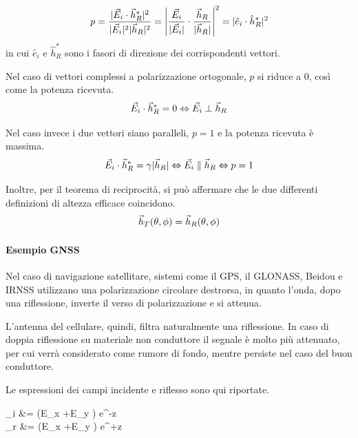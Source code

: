\begin{equation}
	p
	=\frac{|\vec{E}_i \cdot \vec{h}_R^*|^2}{|\vec{E}_i|^2 |\vec{h}_R|^2}
	= \left|
		\frac{\vec{E}_i}{|\vec{E}_i|}\cdot\frac{\vec{h}_R}{|\vec{h}_R|}
	\right|^2
	= |\hat{e}_i \cdot \hat{h}_R^*|^2
\end{equation}
in cui $\hat{e}_i$ e $\hat{h}_R^*$ sono i fasori di direzione dei corrispondenti vettori.

Nel caso di vettori complessi a polarizzazione ortogonale, $p$ si riduce a 0, così come la potenza ricevuta.
\begin{equation}
	\vec{E}_i \cdot \vec{h}_R^* =0 \Leftrightarrow \vec{E}_i \perp \vec{h}_R
\end{equation}

Nel caso invece i due vettori siano paralleli, $p = 1$ e la potenza ricevuta è massima.
\begin{equation}
	\vec{E}_i \cdot \vec{h}_R^* = \gamma |\vec{h}_R|
	\Leftrightarrow \vec{E}_i \parallel \vec{h}_R
	\Leftrightarrow p=1
\end{equation}

\bigbreak
Inoltre, per il teorema di reciprocità, si può affermare che le due differenti definizioni di altezza efficace coincidono.
\begin{equation}
	\vec{h}_T(\theta,\phi) = \vec{h}_R(\theta,\phi)
\end{equation}

\paragraph{Esempio GNSS}
Nel caso di navigazione satellitare, sistemi come il GPS, il \textsc{GLONASS}, Beidou e \textsc{IRNSS} utilizzano una polarizzazione circolare destrorsa, in quanto l'onda, dopo una riflessione, inverte il verso di polarizzazione e si attenua.

L'antenna del cellulare, quindi, filtra naturalmente una riflessione. In caso di doppia riflessione su materiale non conduttore il segnale è molto più attenuato, per cui verrà considerato come rumore di fondo, mentre persiste nel caso del buon conduttore.

Le espressioni dei campi incidente e riflesso sono qui riportate.
\begin{esp*}
	\E_i &= (E_x \cdot {}+E_y \cdot {}) \cdot e^{\textcolor[rgb]{0.8,0,0}{-}\jmath \beta z} \\
	\E_r &= (E_x \cdot {}+E_y \cdot {}) \cdot \rho \cdot e^{\textcolor[rgb]{0.8,0,0}{+}\jmath \beta z} \\
\end{esp*}

